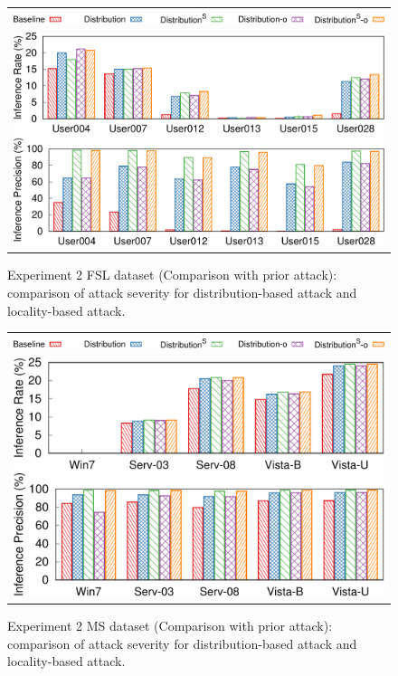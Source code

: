 \begin{figure}[t]
    \centering
    \begin{tabular}{c}
        \includegraphics[width=.7\textwidth]{pic/legend-fsl-bar.pdf}\\
        \includegraphics[width=.7\textwidth]{pic/distribution-comparison-fsl.pdf} 
    \end{tabular}
    \caption{Experiment 2 FSL dataset  (Comparison with prior attack): comparison of attack severity for distribution-based attack and locality-based attack.}
    \label{fig:distribution-comparison}
\end{figure}

\begin{figure}[t]
    \centering
    \begin{tabular}{c}
        \includegraphics[width=.7\textwidth]{pic/legend-fsl-bar.pdf}\\
        \includegraphics[width=.7\textwidth]{pic/distribution-comparison-ms.pdf}\\
    \end{tabular}
    \caption{Experiment 2 MS dataset (Comparison with prior attack): comparison of attack severity for distribution-based attack and locality-based attack.}
    \label{fig:distribution-comparison}
\end{figure}


